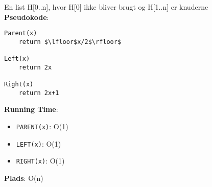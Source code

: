 En list H[0..n], hvor H[0] ikke bliver brugt og H[1..n] er knuderne\\
\textbf{Pseudokode}:
\begin{lstlisting}[frame=single, mathescape=true]
Parent(x)
	return $\lfloor$x/2$\rfloor$

Left(x)
	return 2x

Right(x)
	return 2x+1
\end{lstlisting}
\textbf{Running Time}:
\begin{itemize}
	\item \texttt{PARENT(x)}: O(1)
	\item \texttt{LEFT(x)}: O(1)
	\item \texttt{RIGHT(x)}: O(1)
\end{itemize}
\textbf{Plads}: O(n)